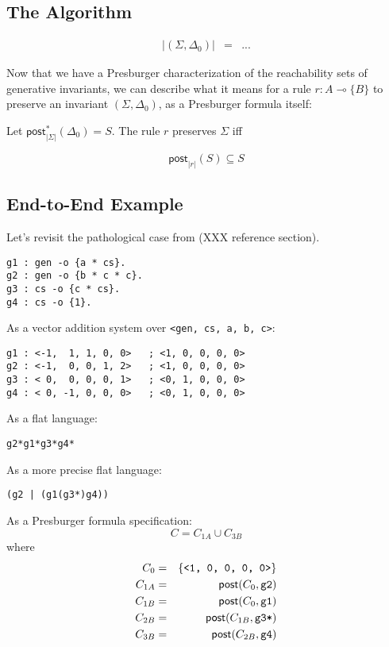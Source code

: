 \documentclass[fullpage, 11pt]{article}
\newcommand{\lolli}{\multimap}
\newcommand{\mon}[1]{\{#1\}}
\begin{document}

\subsection{The Algorithm}

\begin{eqnarray}
| (\Sigma, \Delta_0) | &=& ...
\end{eqnarray}

Now that we have a Presburger characterization of the reachability sets of
generative invariants, we can describe what it means for a rule $r : A
\lolli \mon{B}$ to preserve an invariant $(\Sigma, \Delta_0)$, as a
Presburger formula itself:

Let $\mathsf{post}^*_{|\Sigma|}(\Delta_0) = S$. The rule $r$ preserves $\Sigma$ iff

\[
\mathsf{post}_{|r|}(S) \subseteq S
\]


\subsection{End-to-End Example}

Let's revisit the pathological case from (XXX reference section).

\begin{verbatim}
g1 : gen -o {a * cs}.
g2 : gen -o {b * c * c}.
g3 : cs -o {c * cs}.
g4 : cs -o {1}.
\end{verbatim}

As a vector addition system over \verb|<gen, cs, a, b, c>|:
\begin{verbatim}
g1 : <-1,  1, 1, 0, 0>   ; <1, 0, 0, 0, 0>
g2 : <-1,  0, 0, 1, 2>   ; <1, 0, 0, 0, 0>
g3 : < 0,  0, 0, 0, 1>   ; <0, 1, 0, 0, 0>
g4 : < 0, -1, 0, 0, 0>   ; <0, 1, 0, 0, 0>
\end{verbatim}

As a flat language:
\begin{verbatim}
g2*g1*g3*g4*
\end{verbatim}

As a more precise flat language:
\begin{verbatim}
(g2 | (g1(g3*)g4))
\end{verbatim}

As a Presburger formula specification:
\[
  C = C_{1A} \cup C_{3B}
\]
where
\begin{eqnarray*}
C_0     &=& \{ \verb|<1, 0, 0, 0, 0>| \}\\
C_{1A}  &=& \mathsf{post}(C_0, \verb|g2|)\\
C_{1B}  &=& \mathsf{post}(C_0, \verb|g1|)\\
C_{2B}  &=& \mathsf{post}(C_{1B}, \verb|g3*|)\\
C_{3B}  &=& \mathsf{post}(C_{2B}, \verb|g4|)
\end{eqnarray*}
\end{document}
